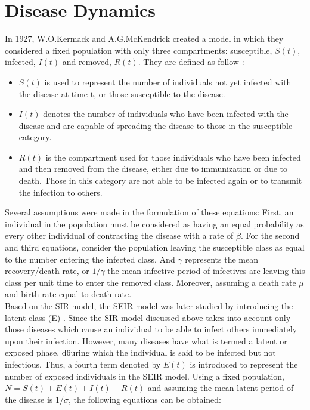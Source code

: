 \documentclass[review]{elsarticle}
\theoremstyle{plain}
\theoremstyle{definition}
\theoremstyle{remark}
\numberwithin{equation}{section}
\theoremstyle{remark}
\begin{document}
\section{Disease Dynamics}
In 1927, W.O.Kermack and A.G.McKendrick created a model in which they considered a fixed population with only three compartments: susceptible, $S(t)$, infected, $I(t)$ and removed, $R(t)$. They are defined as follow \cite{kermack1927contribution}:

\begin{itemize}

\item $S(t)$ is used to represent the number of individuals not yet infected with the disease at time t, or those susceptible to the disease.
\item $I(t)$ denotes the number of individuals who have been infected with the disease and are capable of spreading the disease to those in the susceptible category.
\item $R(t)$ is the compartment used for those individuals who have been infected and then removed from the disease, either due to immunization or due to death. Those in this category are not able to be infected again or to transmit the infection to others.
 
\end{itemize}

Several assumptions were made in the formulation of these equations: First, an individual in the population must be considered as having an equal probability as every other individual of contracting the disease with a rate of $\beta$.  For the second and third equations, consider the population leaving the susceptible class as equal to the number entering the infected class. And $\gamma$ represents the mean recovery/death rate, or $1/\gamma$ the mean infective period of infectives are leaving this class per unit time to enter the removed class. Moreover, assuming a death rate $\mu$ and birth rate equal to death rate.\\

Based on the SIR model, the SEIR model was later studied by introducing the latent class (E) \cite{lloyd1996spatial}. Since the SIR model discussed above takes into account only those diseases which cause an individual to be able to infect others immediately upon their infection. However, many diseases have what is termed a latent or exposed phase, d6uring which the individual is said to be infected but not infectious. Thus, a fourth term denoted by $E(t)$ is introduced to represent the number of exposed individuals in the SEIR model. Using a fixed population, $N=S(t)+E(t)+I(t)+R(t)$ and assuming the mean latent period of the disease is $1/\sigma$, the following equations can be obtained:
\end{document}
